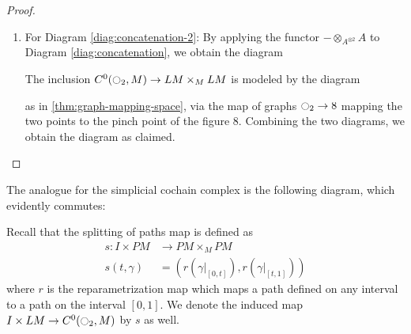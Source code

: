 \documentclass{scrartcl}
\theoremstyle{plain}
\theoremstyle{definition}
\newcommand{\blank}{-}
\begin{document}
\begin{proof}
\begin{enumerate}
    \item For Diagram \ref{diag:concatenation-2}: By applying the functor $\blank \otimes_{A^{\otimes 2}} A$ to Diagram \ref{diag:concatenation}, we obtain the diagram
    \begin{center}
    \end{center}
    The inclusion $ C^0(\ocircle_2, M)\to LM\times_M LM$ is modeled by the diagram
    \begin{center}
    \end{center}
    as in \ref{thm:graph-mapping-space}, via the map of graphs $\ocircle_2\to 8$ mapping the two points to the pinch point of the figure $8$. Combining the two diagrams, we obtain the diagram as claimed.
\end{enumerate}
\end{proof}

The analogue for the simplicial cochain complex is the following diagram, which evidently commutes:
\begin{center}
\end{center}


Recall that the splitting of paths map is defined as
\begin{align*} 
    s\colon I\times PM &\to PM\times_M PM\\
    s(t, \gamma)&=\left(r(\gamma|_{[0, t]}) , r(\gamma|_{[t, 1]})\right)
\end{align*}
where $r$ is the reparametrization map which maps a path defined on any interval to a path on the interval $[0,1]$. We denote the induced map $I\times LM\to C^0(\ocircle_2, M)$ by $s$ as well.
\end{document}
